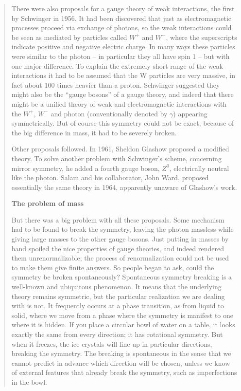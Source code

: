 \begin{quote}
There were also proposals for a gauge theory of weak interactions, the first by Schwinger in 1956. It had been discovered that just as electromagnetic processes proceed via exchange of photons, so the weak interactions could be seen as mediated by particles called $W^+$ and $W^-$, where the superscripts indicate positive and negative electric charge. In many ways these particles were similar to the photon -- in particular they all have spin 1 -- but with one major difference. To explain the extremely short range of the weak interactions it had to be assumed that the W particles are very massive, in fact about 100 times heavier than a proton. Schwinger suggested they might also be the “gauge bosons” of a gauge theory, and indeed that there might be a unified theory of weak and electromagnetic interactions with the $W^+$, $W^-$ and photon (conventionally denoted by $\gamma$) appearing symmetrically. But of course this symmetry could not be exact; because of the big difference in mass, it had to be severely broken.

Other proposals followed. In 1961, Sheldon Glashow proposed a modified theory. To solve another problem with Schwinger’s scheme, concerning mirror symmetry, he added a fourth gauge boson, $Z^0$, electrically neutral like the photon. Salam and his collaborator, John Ward, proposed essentially the same theory in 1964, apparently unaware of Glashow’s work.

\textbf{The problem of mass}

But there was a big problem with all these proposals. Some mechanism had to be found to break the symmetry, leaving the photon massless while giving large masses to the other gauge bosons. Just putting in masses by hand spoiled the nice properties of gauge theories, and indeed rendered them unrenormalizable; the process of renormalization could not be used to make them give finite answers. So people began to ask, could the symmetry be broken spontaneously? Spontaneous symmetry breaking is a well-known and ubiquitous phenomenon. It means that the underlying theory remains symmetric, but the particular realization we are dealing with is not. It frequently occurs at a phase transition, as from liquid to solid, where we move from a phase where the symmetry is manifest to one where it is hidden. If you place a circular bowl of water on a table, it looks exactly the same from every direction; it has rotational symmetry. But when it freezes, the ice crystals will line up in particular directions, breaking the symmetry. The breaking is spontaneous in the sense that we cannot predict in advance which direction will be chosen, unless we know of external features that already break the symmetry, such as imperfections in the bowl.


\end{quote}
